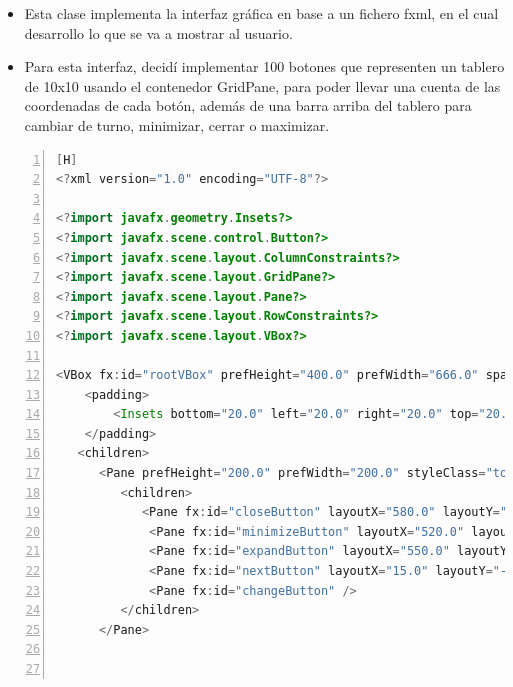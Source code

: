 \documentclass{article}
\begin{document}
	\begin{itemize}	
		\item Esta clase implementa la interfaz gráfica en base a un fichero fxml, en el cual desarrollo lo que se va a mostrar al usuario.
		\item Para esta interfaz, decidí implementar 100 botones que representen un tablero de 10x10 usando el contenedor GridPane, para poder llevar una cuenta de las coordenadas de cada botón, además de una barra arriba del tablero para cambiar de turno, minimizar, cerrar o maximizar.
	\end{itemize}
	\begin{lstlisting}[language=java,caption={Archivo FXML}, numbers=left][H]
<?xml version="1.0" encoding="UTF-8"?>

<?import javafx.geometry.Insets?>
<?import javafx.scene.control.Button?>
<?import javafx.scene.layout.ColumnConstraints?>
<?import javafx.scene.layout.GridPane?>
<?import javafx.scene.layout.Pane?>
<?import javafx.scene.layout.RowConstraints?>
<?import javafx.scene.layout.VBox?>

<VBox fx:id="rootVBox" prefHeight="400.0" prefWidth="666.0" spacing="20.0" styleClass="vbox" stylesheets="@style.css" xmlns="http://javafx.com/javafx/21" xmlns:fx="http://javafx.com/fxml/1" fx:controller="com.example.lab22.VideoGameController">
    <padding>
        <Insets bottom="20.0" left="20.0" right="20.0" top="20.0" />
    </padding>
   <children>
      <Pane prefHeight="200.0" prefWidth="200.0" styleClass="toolBar">
         <children>
            <Pane fx:id="closeButton" layoutX="580.0" layoutY="-12.0" onMouseClicked="#handleCloseButton" />
             <Pane fx:id="minimizeButton" layoutX="520.0" layoutY="-12.0" onMouseClicked="#handleMinimizeButton" />
             <Pane fx:id="expandButton" layoutX="550.0" layoutY="-12.0" onMouseClicked="#handleExpandButton" />
             <Pane fx:id="nextButton" layoutX="15.0" layoutY="-12.0" onMouseClicked="#changeTurn" />
             <Pane fx:id="changeButton" />
         </children>
      </Pane>
       


\end{lstlisting}
\end{document}
